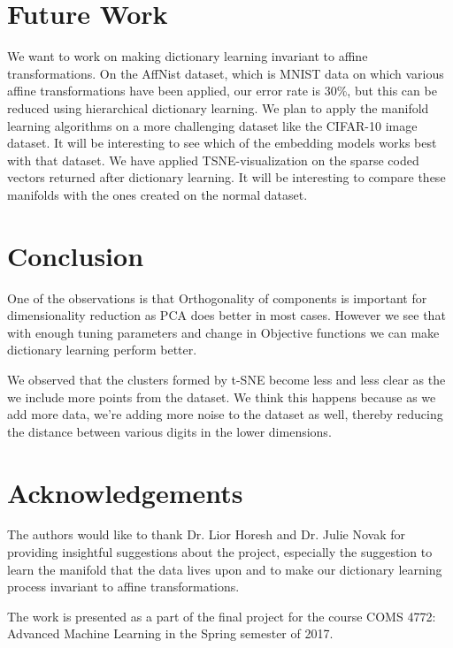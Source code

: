\documentclass{article}
\begin{document}
\section{Future Work}

We want to work on making dictionary learning invariant to affine transformations. On the AffNist dataset, which is MNIST data on which various affine transformations have been applied, our error rate is 30\%, but this can be reduced using hierarchical dictionary learning.
We plan to apply the manifold learning algorithms on a more challenging dataset like the CIFAR-10 image dataset. It will be interesting to see which of the embedding models works best with that dataset.
We have applied TSNE-visualization on the sparse coded vectors returned after dictionary learning. It will be interesting to compare these manifolds with the ones created on the normal dataset.

\section{Conclusion}
One of the observations is that Orthogonality of components is important for dimensionality reduction as PCA does better in most cases. However we see that with enough tuning parameters and change in Objective functions we can make dictionary learning perform better.

We observed that the clusters formed by t-SNE become less and less clear as the we include more points from the dataset. We think this happens because as we add more data, we're adding more noise to the dataset as well, thereby reducing the distance between various digits in the lower dimensions.

\section*{Acknowledgements}

The authors would like to thank Dr. Lior Horesh and Dr. Julie Novak for providing insightful suggestions about the project, especially the suggestion to learn the manifold that the data lives upon and to make our dictionary learning process invariant to affine transformations.

The work is presented as a part of the final project for the course COMS 4772: Advanced Machine Learning in the Spring semester of 2017.



\end{document}
